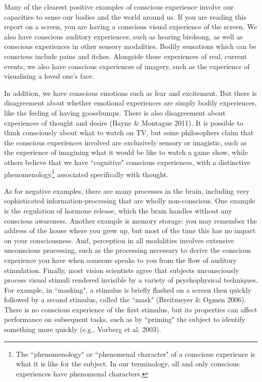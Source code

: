 \documentclass[12pt]{article}
\begin{document}
Many of the clearest positive examples of conscious experience involve our capacities to sense our bodies and the world around us. If you are reading this report on a screen, you are having a conscious visual experience of the screen. We also have conscious auditory experiences, such as hearing birdsong, as well as conscious experiences in other sensory modalities. Bodily sensations which can be conscious include pains and itches. Alongside these experiences of real, current events, we also have conscious experiences of imagery, such as the experience of visualising a loved one’s face.

In addition, we have conscious emotions such as fear and excitement. But there is disagreement about whether emotional experiences are simply bodily experiences, like the feeling of having goosebumps. There is also disagreement about experiences of thought and desire (Bayne \& Montague 2011). It is possible to think consciously about what to watch on TV, but some philosophers claim that the conscious experiences involved are exclusively sensory or imagistic, such as the experience of imagining what it would be like to watch a game show, while others believe that we have ``cognitive" conscious experiences, with a distinctive phenomenology\footnote{The ``phenomenology" or ``phenomenal character" of a conscious experience is what it is like for the subject. In our terminology, all and only conscious experiences have phenomenal characters.} associated specifically with thought.

As for negative examples, there are many processes in the brain, including very sophisticated information-processing that are wholly non-conscious. One example is the regulation of hormone release, which the brain handles without any conscious awareness. Another example is memory storage: you may remember the address of the house where you grew up, but most of the time this has no impact on your consciousness. And, perception in all modalities involves extensive unconscious processing, such as the processing necessary to derive the conscious experience you have when someone speaks to you from the flow of auditory stimulation. Finally, most vision scientists agree that subjects unconsciously process visual stimuli rendered invisible by a variety of psychophysical techniques. For example, in ``masking", a stimulus is briefly flashed on a screen then quickly followed by a second stimulus, called the ``mask" (Breitmeyer \& Ogmen 2006). There is no conscious experience of the first stimulus, but its properties can affect performance on subsequent tasks, such as by ``priming" the subject to identify something more quickly (e.g., Vorberg et al. 2003).
\end{document}
